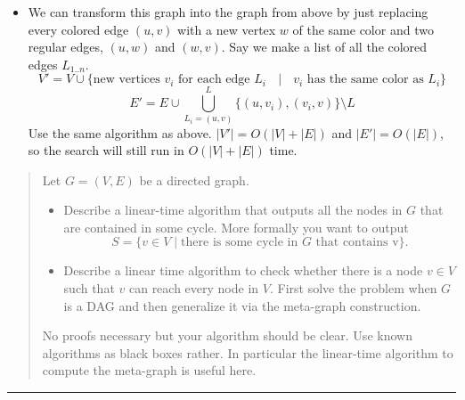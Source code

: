 \documentclass[11pt]{article}
\begin{document}
\begin{solution}
\begin{itemize}
        \item We can transform this graph into the graph from above by just replacing every colored edge $(u, v)$ with a new vertex $w$ of the same color and two regular edges, $(u, w)$ and $(w, v)$. Say we make a list of all the colored edges $L_{1..n}$.
            \[
                V' = V \cup \{\text{new vertices $v_i$ for each edge $L_i$ $\mid$ $v_i$ has the same color as $L_i$}\}
            \]
            \[
                E' = E \cup \bigcup^L_{L_i = (u, v)}{\{(u, v_i), (v_i, v)\}}\setminus L
            \]
            Use the same algorithm as above. $|V'| = O(|V| + |E|)$ and $|E'| = O(|E|)$, so the search will still run in $O(|V| + |E|)$ time.
    \end{itemize}
\end{solution}


\begin{quote}
Let $G=(V,E)$ be a directed graph.
  \begin{itemize}
  \item Describe a linear-time algorithm that outputs all the nodes in
    $G$ that are contained in some cycle. More formally you want to
    output
    $$S = \{ v \in V \mid \text{there is some cycle in $G$ that
      contains v}\}.$$
  \item Describe a linear time algorithm to check whether there is a
    node $v \in V$ such that $v$ can reach every node in $V$. First
    solve the problem when $G$ is a DAG and then generalize it via the
    meta-graph construction.
  \end{itemize}
  No proofs necessary but your algorithm should be clear. Use known
  algorithms as black boxes rather. In particular the linear-time algorithm to
  compute the meta-graph is useful here.
\end{quote}
\hrule
\end{document}
